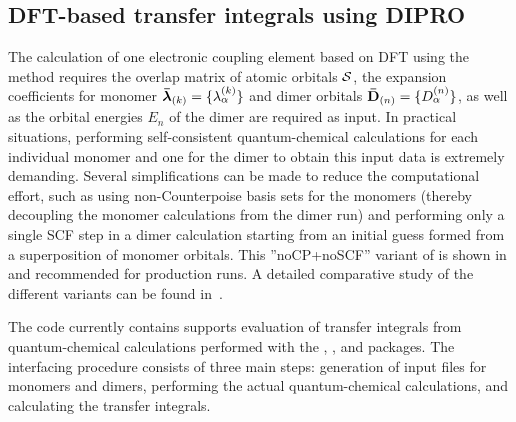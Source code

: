 \subsection{DFT-based transfer integrals using DIPRO}
\label{sec:dft}

The calculation of one electronic coupling element based on DFT using the \dipro method requires the overlap matrix of atomic orbitals $\mathbf{ \mathcal{S} }$, the expansion coefficients for monomer $\mathbf{ \bar{\boldsymbol{\lambda}} }_{(k)} = \{ \lambda_\alpha^{(k)}\}$ and dimer orbitals $\mathbf{ \bar{D} }_{(n)} = \{ D^{(n)}_{\alpha} \}$, as well as the orbital energies $E_{n}$ of the dimer are required as input. In practical situations, performing self-consistent quantum-chemical calculations for each individual monomer and one for the dimer to obtain this input data is extremely demanding. Several simplifications can be made to reduce the computational effort, such as using non-Counterpoise basis sets for the monomers (thereby decoupling the monomer calculations from the dimer run) and performing only a single SCF step in a dimer calculation starting from an initial guess formed from a superposition of monomer orbitals. This ''noCP+noSCF'' variant of \dipro is shown in  and recommended for production runs. A detailed comparative study of the different variants can be found in~\cite{baumeier_density-functional_2010}.


The code currently contains supports evaluation of transfer integrals from quantum-chemical calculations performed with the \gaussian, \turbomole, and \nwchem packages. The interfacing procedure consists of three main steps: generation of input files for monomers and dimers, performing the actual quantum-chemical calculations, and calculating the transfer integrals. 

